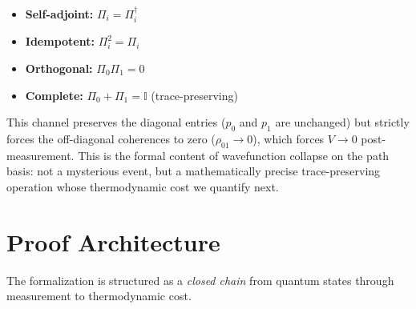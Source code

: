 \documentclass[11pt, a4paper]{article}
\begin{document}
\begin{itemize}
\item \textbf{Self-adjoint:} $\Pi_i = \Pi_i^\dagger$
\item \textbf{Idempotent:} $\Pi_i^2 = \Pi_i$
\item \textbf{Orthogonal:} $\Pi_0 \Pi_1 = 0$
\item \textbf{Complete:} $\Pi_0 + \Pi_1 = \mathbb{I}$ (trace-preserving)
\end{itemize}

This channel preserves the diagonal entries ($p_0$ and $p_1$ are unchanged) but strictly forces the off-diagonal coherences to zero ($\rho_{01} \to 0$), which forces $V \to 0$ post-measurement. This is the formal content of wavefunction collapse on the path basis: not a mysterious event, but a mathematically precise trace-preserving operation whose thermodynamic cost we quantify next.

\section{Proof Architecture}

The formalization is structured as a \emph{closed chain} from quantum states through measurement to thermodynamic cost.
\end{document}
